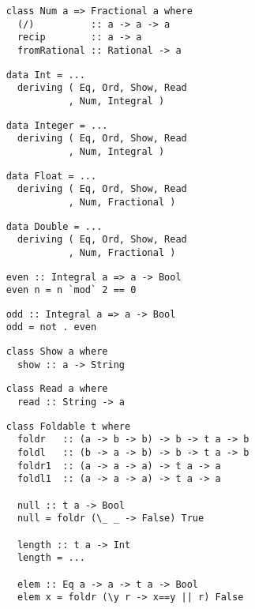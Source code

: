 \begin{multicols}{2}
	\begin{verbatim}
	class Num a => Fractional a where
	  (/)          :: a -> a -> a
	  recip        :: a -> a
	  fromRational :: Rational -> a
	\end{verbatim}
	
	\begin{verbatim}
	data Int = ...
	  deriving ( Eq, Ord, Show, Read
	           , Num, Integral )
	\end{verbatim}
	
	\begin{verbatim}
	data Integer = ...
	  deriving ( Eq, Ord, Show, Read
	           , Num, Integral )
	\end{verbatim}
	
	\begin{verbatim}
	data Float = ...
	  deriving ( Eq, Ord, Show, Read
	           , Num, Fractional )
	\end{verbatim}
	
	\begin{verbatim}
	data Double = ...
	  deriving ( Eq, Ord, Show, Read
	           , Num, Fractional )
	\end{verbatim}
	
	\begin{verbatim}
	even :: Integral a => a -> Bool 
	even n = n `mod` 2 == 0
	\end{verbatim}
	
	\begin{verbatim}
	odd :: Integral a => a -> Bool 
	odd = not . even
	\end{verbatim}
	
	\begin{verbatim}
	class Show a where
	  show :: a -> String
	\end{verbatim}
	
	\begin{verbatim}
	class Read a where 
	  read :: String -> a
	\end{verbatim}
	
	\begin{verbatim}
	class Foldable t where
	  foldr   :: (a -> b -> b) -> b -> t a -> b
	  foldl   :: (b -> a -> b) -> b -> t a -> b
	  foldr1  :: (a -> a -> a) -> t a -> a
	  foldl1  :: (a -> a -> a) -> t a -> a
	  
	  null :: t a -> Bool 
	  null = foldr (\_ _ -> False) True
	  
	  length :: t a -> Int
	  length = ...
	  
	  elem :: Eq a -> a -> t a -> Bool 
	  elem x = foldr (\y r -> x==y || r) False
	  

\end{verbatim}
\end{multicols}
